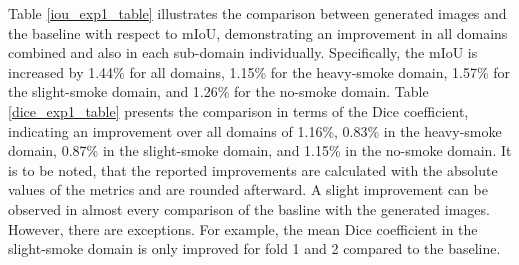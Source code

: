 Table \ref{iou_exp1_table} illustrates the comparison between generated images and the baseline with respect to mIoU, demonstrating an improvement in all domains combined and also in each sub-domain individually.
Specifically, the mIoU is increased by 1.44\% for all domains, 1.15\% for the heavy-smoke domain, 1.57\% for the slight-smoke domain, and 1.26\% for the no-smoke domain.
Table \ref{dice_exp1_table} presents the comparison in terms of the Dice coefficient, indicating an improvement over all domains of 1.16\%, 0.83\% in the heavy-smoke domain, 0.87\% in the slight-smoke domain, and 1.15\% in the no-smoke domain.
It is to be noted, that the reported improvements are calculated with the absolute values of the metrics and are rounded afterward.
A slight improvement can be observed in almost every comparison of the basline with the generated images.
However, there are exceptions.
For example, the mean Dice coefficient in the slight-smoke domain is only improved for fold 1 and 2 compared to the baseline.\\
